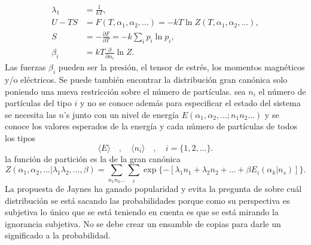 \begin{align*}
\lambda_{1} &=\frac{1}{kT}, \\
U-TS &= F(T,\alpha_{1},\alpha_{2},...)=-kT \ln Z(T,\alpha_{1},\alpha_{2},...), \\
S &= -\frac{\partial F}{\partial T}=-k\sum_{i} p_{i} \ln p_{i}, \\
\beta_{i} &= kT \frac{\partial }{\partial \alpha_{i}} \ln Z.
\end{align*}
Las fuerzas $\beta_{i}$ pueden ser la presión, el tensor de estrés, los momentos magnéticos y/o  eléctricos. Se puede también encontrar la distribución gran canónica solo poniendo una nueva restricción sobre el número de partículas. sea $n_{i}$ el número de partículas del tipo $i$ y no se conoce además para especificar el estado del sistema se necesita las $n$'s junto con un nivel de energía $E(\alpha_{1},\alpha_{2},...;n_{1}n_{2}...)$ y se conoce los valores esperados de la energía y cada número de partículas de todos los tipos
\begin{equation}
\langle E \rangle \quad , \quad \langle n_{i} \rangle \quad , \quad i=  \{ 1,2,... \}.
\end{equation}
la función de partición es la de la gran canónica
\begin{equation}
Z(\alpha_{1},\alpha_{2},...|\lambda_{1} \lambda_{2} ,...,\beta )= \sum_{n_{1} n_{2}...} \sum_{i} \exp \{ -[ \lambda_{1} n_{1}+\lambda_{2} n_{2}+...+\beta E_{i} (\alpha_{k} | n_{s} ) ] \}.
\end{equation}
La propuesta de Jaynes ha ganado popularidad y evita la pregunta de sobre cuál distribución se está sacando las probabilidades porque como su perspectiva es subjetiva lo único que se está teniendo en cuenta es que se está mirando la ignorancia subjetiva. No se debe crear un ensamble de copias para darle un significado a la probabilidad.